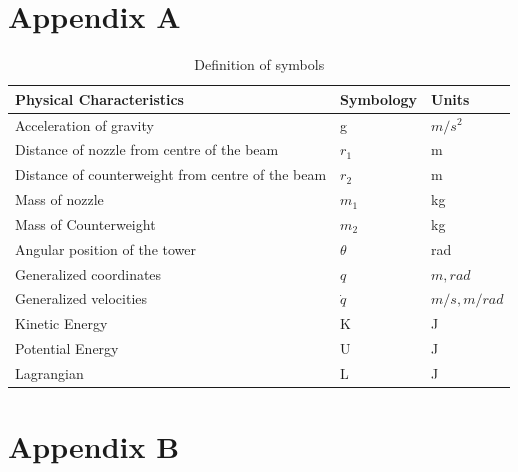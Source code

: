 \documentclass{UoNMCHA}
\numberwithin{equation}{section}
\begin{document}
	
	\newpage
	\newpage
	\appendix
	
	\section{Appendix A}
	
	\begin{table}[H] \label{tab:physical Characteristics}
		\caption{Definition of symbols}
		\begin{tabular}{lll}
			\textbf{Physical Characteristics}                 & \textbf{Symbology} & \textbf{Units}                              \\ \hline
			Acceleration of gravity                           & g                  & $m/s^2 $     \\
			Distance of nozzle from centre of the beam        &$ r_1 $              & m                                           \\
			Distance of counterweight from centre of the beam & $r_2$               & m                                           \\
			Mass of nozzle                                    & $m_1$               & kg                                          \\
			Mass of Counterweight                             & $m_2 $              & kg                                          \\
			Angular position of the tower                     & $\theta$                  & rad                                         \\
			Generalized coordinates                           & $q$                  & $m,rad$                                     \\
			Generalized velocities                            & $\dot{q}$          & $m/s,m/rad$ \\
			Kinetic Energy                                    & K                  & J                                           \\
			Potential Energy                                  & U                  & J                                           \\
			Lagrangian                                        & L                  & J                                          
		\end{tabular}
	\end{table}
	
	\section{Appendix B}\label{animate}
	
	
	
	
	
\end{document}
